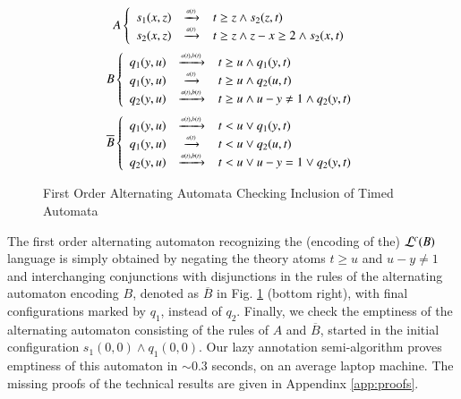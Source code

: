 \begin{figure}[htb]
\vspace*{-2\baselineskip}
\begin{center}
\begin{minipage}{5cm}

\end{minipage} 
\begin{minipage}{5cm}
\footnotesize{\[A \left\{\begin{array}{rcl}
s_1(x,z) & \xrightarrow{{\scriptscriptstyle a(t)}}_{{\scriptstyle }} & t \geq z \wedge s_2(z,t) \\
s_2(x,z) & \xrightarrow{{\scriptscriptstyle a(t)}}_{{\scriptstyle }} & t \geq z \wedge z-x \geq 2 \wedge s_2(x,t)
\end{array}\right.\] 
\[B \left\{\begin{array}{rcl}
q_1(y,u) & \xrightarrow{{\scriptscriptstyle a(t),b(t)}}_{{\scriptstyle }} & t \geq u \wedge q_1(y,t) \\
q_1(y,u) & \xrightarrow{{\scriptscriptstyle a(t)}}_{{\scriptstyle }} & t \geq u \wedge q_2(u,t) \\
q_2(y,u) & \xrightarrow{{\scriptscriptstyle a(t),b(t)}}_{{\scriptstyle }} & t \geq u \wedge u - y \neq 1 \wedge q_2(y,t)
\end{array}\right.\]
\[\overline{B}\left\{\begin{array}{rcl}
q_1(y,u) & \xrightarrow{{\scriptscriptstyle a(t),b(t)}}_{{\scriptstyle }} & t < u \vee q_1(y,t) \\
q_1(y,u) & \xrightarrow{{\scriptscriptstyle a(t)}}_{{\scriptstyle }} & t < u \vee q_2(u,t) \\
q_2(y,u) & \xrightarrow{{\scriptscriptstyle a(t),b(t)}}_{{\scriptstyle }} & t < u \vee u - y = 1 \vee q_2(y,t)
\end{array}\right.\]}
\end{minipage}
\end{center}
\vspace*{-\baselineskip}
\caption{First Order Alternating Automata Checking Inclusion of Timed Automata}
\label{fig:ta}
\vspace*{-\baselineskip}
\end{figure}

The first order alternating automaton recognizing the (encoding of
the) ${\mathcal L}^c({B})$ language is simply obtained by negating the theory
atoms $t \geq u$ and $u - y \neq 1$ and interchanging conjunctions
with disjunctions in the rules of the alternating automaton encoding
$B$, denoted as $\overline{B}$ in Fig. \ref{fig:ta} (bottom right),
with final configurations marked by $q_1$, instead of $q_2$. Finally,
we check the emptiness of the alternating automaton consisting of the
rules of $A$ and $\overline{B}$, started in the initial configuration
$s_1(0,0) \wedge q_1(0,0)$. Our lazy annotation semi-algorithm proves
emptiness of this automaton in $\sim\!0.3$ seconds, on an average
laptop machine. The missing proofs of the technical results are given
in Appendinx \ref{app:proofs}.

